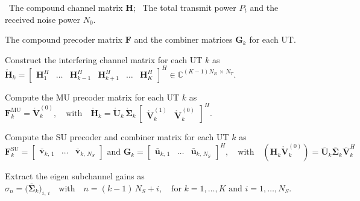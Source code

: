 \begin{algorithm}[b!]
\caption{\ac{BD} Precoding}
\label{alg:bd_precoding}
\begin{algorithmic}[1]
    
    \Require 
    \Statex \hspace{-\algorithmicindent} \textbullet \, The compound channel matrix $\mathbf{H}$;
    \Statex \hspace{-\algorithmicindent} \textbullet \, The total transmit power $P_t$ and the received noise power $N_0$.
    
    \Ensure  The compound precoder matrix $\mathbf{F}$ and the combiner matrices $\mathbf{G}_k$ for each \ac{UT}.

    \medskip
    \State Construct the interfering channel matrix for each \ac{UT} $k$ as
    \Statex $\mathring{\mathbf{H}}_k = \begin{bmatrix} \mathbf{H}_1^H & \dots & \mathbf{H}_{k-1}^H & \mathbf{H}_{k+1}^H & \dots & \mathbf{H}_K^H \end{bmatrix}^H \in \mathbb{C}^{(K-1)N_R \, \times \, N_T}.$
    
    \vspace{0.4\baselineskip}
    \State Compute the \ac{MU} precoder matrix for each \ac{UT} $k$ as
    \Statex $\mathbf{F}_k^{\mathrm{MU}} = \mathring{\mathbf{V}}_{k}^{(0)}, \quad \text{with} \quad \mathring{\mathbf{H}}_k  = \mathring{\mathbf{U}}_k \, \mathring{\boldsymbol{\Sigma}}_k \, \begin{bmatrix} \mathring{\mathbf{V}}_{k}^{(1)} & \mathring{\mathbf{V}}_{k}^{(0)} \end{bmatrix}^H.$

    \vspace{0.4\baselineskip}
    \State Compute the \ac{SU} precoder and combiner matrix for each \ac{UT} $k$ as
    \Statex $\mathbf{F}_k^{\mathrm{SU}} = \begin{bmatrix} \bar{\mathbf{v}}_{k, \, 1} & \dots & \bar{\mathbf{v}}_{k, \, N_S} \end{bmatrix} \text{  and  } \mathbf{G}_k = \begin{bmatrix} \bar{\mathbf{u}}_{k, \, 1} & \dots & \bar{\mathbf{u}}_{k, \, N_S} \end{bmatrix}^H,  \quad \text{with} \quad (\mathbf{H}_k \mathring{\mathbf{V}}_{k}^{(0)}) = \bar{\mathbf{U}}_k \bar{\mathbf{\Sigma}}_k \bar{\mathbf{V}}_k^H$

    \vspace{0.4\baselineskip}
    \State Extract the eigen subchannel gains as
    \Statex $\sigma_n = \big(\bar{\mathbf{\Sigma}}_k\big)_{i,\,i} \quad \text{with} \quad n = (k-1)\,N_S + i, \quad \text{for  } k = 1, \dots, K \text{  and  } i = 1, \dots, N_S.$


\end{algorithmic}
\end{algorithm}
